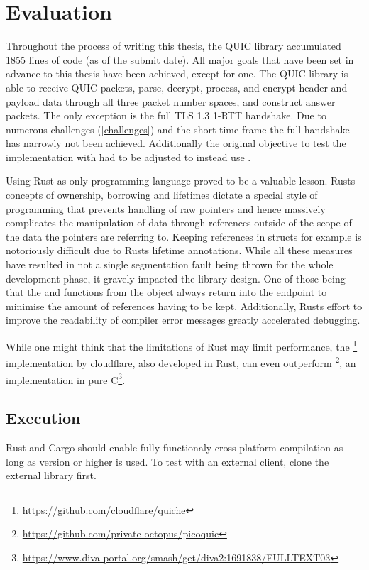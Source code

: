 \chapter{Evaluation}

Throughout the process of writing this thesis, the QUIC library accumulated 1855 lines of code (as of the submit date).
All major goals that have been set in advance to this thesis have been achieved, except for one. The QUIC library is able to receive
QUIC packets, parse, decrypt, process, and encrypt header and payload data through all three packet number spaces, and construct
answer packets. The only exception is the full TLS 1.3 1-RTT handshake. Due to numerous challenges (\ref{challenges}) and the short
time frame the full handshake has narrowly not been achieved. Additionally the original objective to test the implementation with
 had to be adjusted to instead use . 

Using Rust as only programming language proved to be a valuable lesson. Rusts concepts of ownership, borrowing and lifetimes dictate a
special style of programming that prevents handling of raw pointers and hence massively complicates the manipulation of data through
references outside of the scope of the data the pointers are referring to. Keeping references in structs for example is notoriously
difficult due to Rusts lifetime annotations. While all these measures have resulted in not a single segmentation fault being
thrown for the whole development phase, it gravely impacted the library design. One of those being that the 
and  functions from the  object always return into the endpoint to minimise the
amount of references having to be kept. Additionally, Rusts effort to improve the readability of compiler error messages
greatly accelerated debugging.

While one might think that the limitations of Rust may limit performance, the
\footnote{\url{https://github.com/cloudflare/quiche}} implementation by cloudflare, also developed in Rust,
can even outperform \footnote{\url{https://github.com/private-octopus/picoquic}}, an implementation in
pure C\footnote{\url{https://www.diva-portal.org/smash/get/diva2:1691838/FULLTEXT03}}.

\section{Execution}
Rust and Cargo should enable fully functionaly cross-platform compilation as long as  version 
or higher is used. To test with an external client, clone the external library  first.

